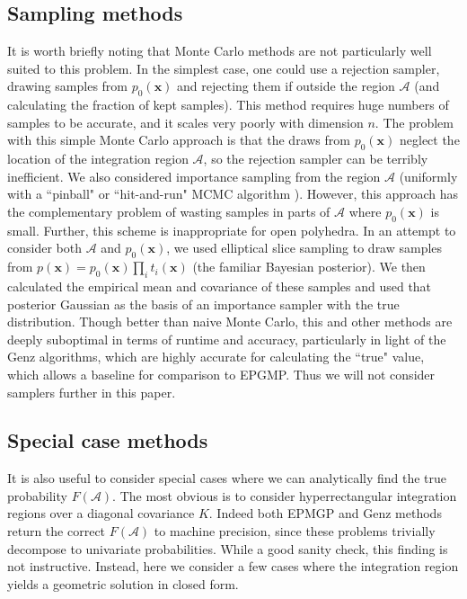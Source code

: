 \documentclass[twoside,11pt]{article}
\def\x{{\mathbf x}}
\def\regionA{\mathcal{A}}
\begin{document}
\subsection{Sampling methods}
\label{sec:mcmc}

It is worth briefly noting that Monte Carlo methods are not particularly well suited to this problem.  In the simplest case, one could use a rejection sampler, drawing samples from $p_0(\x)$ and rejecting them if outside the region $\regionA$ (and calculating the fraction of kept samples).  This method requires huge numbers of samples to be accurate, and it scales very poorly with dimension $n$.  The problem with this simple Monte Carlo approach is that the draws from $p_0(\x)$ neglect the location of the integration region $\regionA$, so the rejection sampler can be terribly inefficient.  We also considered importance sampling from the region $\regionA$ (uniformly with a ``pinball" or ``hit-and-run" MCMC algorithm \cite[]{herbrichBook}).  However, this approach has the complementary problem of wasting samples in parts of $\regionA$ where $p_0(\x)$ is small.  Further, this scheme is inappropriate for open polyhedra.  In an attempt to consider both $\regionA$ and $p_0(\x)$, we used elliptical slice sampling \cite[]{murrayESS} to draw samples from $p(\x) = p_0(\x)\prod_i t_i(\x)$ (the familiar Bayesian posterior).  We then calculated the empirical mean and covariance of these samples and used that posterior Gaussian as the basis of an importance sampler with the true distribution.  Though better than naive Monte Carlo, this and other methods are deeply suboptimal in terms of runtime and accuracy, particularly in light of the Genz algorithms, which are highly accurate for calculating the ``true" value, which allows a baseline for comparison to EPGMP.  Thus we will not consider samplers further in this paper.


\subsection{Special case methods}
\label{sec:specialcases}

It is also useful to consider special cases where we can analytically find the true probability $F(\regionA)$.  The most obvious is to consider hyperrectangular integration regions over a diagonal covariance $K$.  Indeed both EPMGP and Genz methods return the correct $F(\regionA)$ to machine precision, since these problems trivially decompose to univariate probabilities.  While a good sanity check, this finding is not instructive.  Instead, here we consider a few cases where the integration region yields a geometric solution in closed form.
\end{document}
